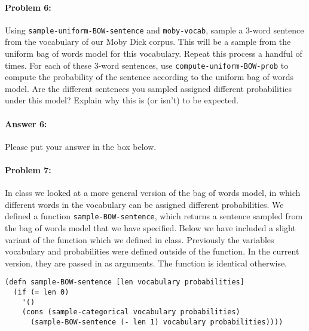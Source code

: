 \documentclass[10pt]{article}
\newenvironment{AnswerBox}{\begin{mdframed}[style=simple]}{\end{mdframed}}
\begin{document}
\paragraph{Problem 6:}

Using \texttt{sample-uniform-BOW-sentence} and \texttt{moby-vocab}, sample a
3-word sentence from the vocabulary of our Moby Dick corpus. This will be a
sample from the uniform bag of words model for this vocabulary. Repeat this
process a handful of times. For each of these 3-word sentences, use
\texttt{compute-uniform-BOW-prob} to compute the probability of the sentence
according to the uniform bag of words model. Are the different sentences you
sampled assigned different probabilities under this model? Explain why this is
(or isn't) to be expected.

\paragraph{Answer 6:} Please put your answer in the box below.

\begin{AnswerBox}%


\end{AnswerBox}%

\hrulefill %

\paragraph{Problem 7:}

In class we looked at a more general version of the bag of words
model, in which different words in the vocabulary can be assigned
different probabilities. We defined a function \texttt{sample-BOW-sentence},
which returns a sentence sampled from the bag of words model that we
have specified. Below we have included a slight variant of the
function which we defined in class. Previously the variables
vocabulary and probabilities were defined outside of the function. In
the current version, they are passed in as arguments. The function is
identical otherwise.

\begin{lstlisting}
(defn sample-BOW-sentence [len vocabulary probabilities]
  (if (= len 0)
    '()
    (cons (sample-categorical vocabulary probabilities)
	  (sample-BOW-sentence (- len 1) vocabulary probabilities))))
\end{lstlisting}
\end{document}
